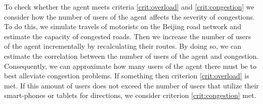 To check whether the agent meets criteria \ref{crit:overload} and \ref{crit:congestion} we consider how the number of users of the agent affects the severity of congestions. To do this, we simulate travels of motorists on the Beijing road network and estimate the capacity of congested roads. Then we increase the number of users of the agent incrementally by recalculating their routes. By doing so, we can estimate the correlation between the number of users of the agent and congestion. Consequently, we can approximate how many users of the agent there must be to best alleviate congestion problems. If something then criterion \ref{crit:overload} is met. If this amount of users does not exceed the number of users that utilize their smart-phones or tablets for directions, we consider criterion \ref{crit:congestion} met.







